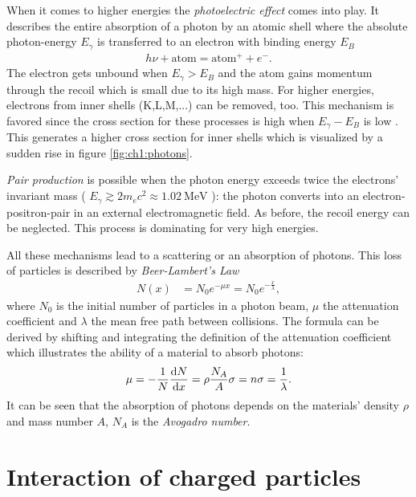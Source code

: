 When it comes to higher energies the \textit{photoelectric effect} comes into play. It describes the entire absorption of a photon by an atomic shell where the absolute photon-energy $E_\gamma$ is transferred to an electron with binding energy $E_B$
\begin{align*}
h\nu + \text{atom} = \text{atom}^{+}+e^{-}.
\end{align*} 
The electron gets unbound when $E_\gamma>E_B$ and the atom gains momentum through the recoil which is small due to its high mass. For higher energies, electrons from inner shells (K,L,M,...) can be removed, too. This mechanism is favored since the cross section for these processes is high when $E_\gamma-E_B$ is low \cite{wermes}. This generates a higher cross section for inner shells which is visualized by a sudden rise in figure \ref{fig:ch1:photons}.\par 
\textit{Pair production} is possible when the photon energy exceeds twice the electrons' invariant mass ( $E_\gamma\gtrsim 2m_ec^2\approx\SI{1.02}{\MeV}$ ): the photon converts into an electron-positron-pair in an external electromagnetic field. As before, the recoil energy can be neglected. This process is dominating for very high energies.\par 
All these mechanisms lead to a scattering or an absorption of photons. This loss of particles is described by \textit{Beer-Lambert's Law}
\begin{align}
N(x)&=N_0e^{-\mu x}=N_0e^{-\frac{x}{\lambda}}, 
\label{eq:beer_lambert}
\end{align} 
where $N_0$ is the initial number of particles in a photon beam, $\mu$ the attenuation coefficient and $\lambda$ the mean free path between collisions. The formula can be derived by shifting and integrating the definition of the attenuation coefficient which illustrates the ability of a material to absorb photons:
\begin{align}
\mu=-\frac{1}{N}\dv{N}{x}=\rho\frac{N_A}{A}\sigma=n\sigma=\frac{1}{\lambda}.
\end{align}
It can be seen that the absorption of photons depends on the materials' density $\rho$ and mass number $A$, $N_A$ is the \textit{Avogadro number}. 

\section{Interaction of charged particles}

